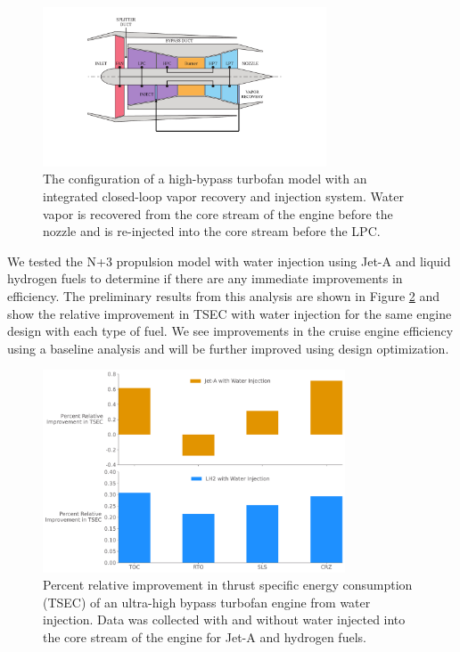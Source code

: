 \documentclass[conf]{new-aiaa}
\begin{document}
\begin{figure}[!hbt]
	\centering
	\includegraphics[width=0.75\textwidth]{turbofan_wvr.pdf}
	\caption{The configuration of a high-bypass turbofan model with an integrated closed-loop vapor recovery and injection system.
		Water vapor is recovered from the core stream of the engine before the nozzle and is re-injected into the core stream before the LPC.}
	\label{fig:hbtf_cycle}
\end{figure}

We tested the N+3 propulsion model with water injection using Jet-A and liquid hydrogen fuels to determine if there are any immediate improvements in efficiency.
The preliminary results from this analysis are shown in Figure \ref{fig:results} and show the relative improvement in TSEC with water injection for the same engine design with each type of fuel.
We see improvements in the cruise engine efficiency using a baseline analysis and will be further improved using design optimization.

\begin{figure}[!hbt]
	\centering
	\includegraphics[width=0.8\textwidth]{JetA-H2_bar_chart_diff.pdf}
	\caption{Percent relative improvement in thrust specific energy consumption (TSEC) of an ultra-high bypass turbofan engine from water injection.
		Data was collected with and without water injected into the core stream of the engine for Jet-A and hydrogen fuels.}
	\label{fig:results}
\end{figure}
\end{document}
